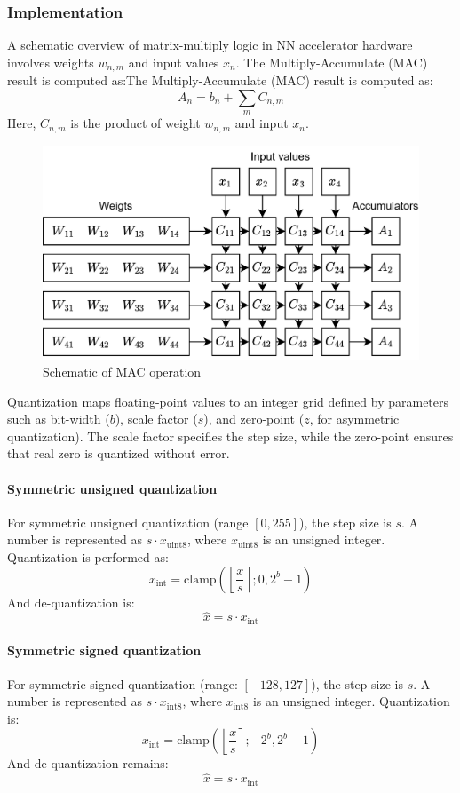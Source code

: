 \subsubsection{Implementation}
A schematic overview of matrix-multiply logic in NN accelerator hardware involves weights $w_{n,m}$ and input values $x_n$.
The Multiply-Accumulate (MAC) result is computed as:The Multiply-Accumulate (MAC) result is computed as:
\[A_n=b_n+\sum_mC_{n,m}\] 
Here, $C_{n,m}$ is the product of weight $w_{n,m}$ and input $x_n$. 
\begin{figure}[H]
    \centering
    \includegraphics[width=0.75\linewidth]{images/eeai9.png}
    \caption{Schematic of MAC operation}
\end{figure}
Quantization maps floating-point values to an integer grid defined by parameters such as bit-width ($b$), scale factor ($s$), and zero-point ($z$, for asymmetric quantization).
The scale factor specifies the step size, while the zero-point ensures that real zero is quantized without error.

\paragraph*{Symmetric unsigned quantization}
For symmetric unsigned quantization (range $[0,255]$), the step size is $s$. 
A number is represented as $s\cdot x_{\text{uint8}}$, where $x_{\text{uint8}}$ is an unsigned integer. 
Quantization is performed as:
\[x_{\text{int}}=\text{clamp}\left(\left\lfloor \dfrac{x}{s}\right\rceil;0,2^b-1 \right)\]
\noindent And de-quantization is:
\[\hat{x}=s\cdot x_{\text{int}}\]

\paragraph*{Symmetric signed quantization}
For symmetric signed quantization (range: $[-128, 127]$), the step size is $s$.
A number is represented as $s\cdot x_{\text{int8}}$, where $x_{\text{int8}}$ is an unsigned integer. 
Quantization is:
\[x_{\text{int}}=\text{clamp}\left(\left\lfloor \dfrac{x}{s}\right\rceil;-2^b,2^b-1 \right)\]
\noindent And de-quantization remains:
\[\hat{x}=s\cdot x_{\text{int}}\]


